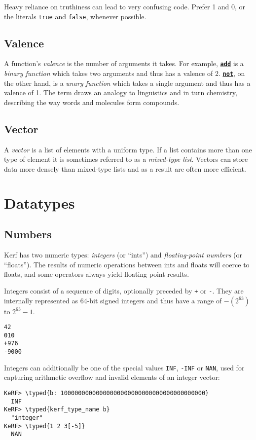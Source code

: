 \documentclass{article}
\newcommand{\typed}[1]{\textcolor{TealBlue}{#1}}
\newcommand{\primu}[2]{\hyperref[prim:#2]{\textbf{\texttt{#1}}}}
\newcommand{\prim}[1]{\primu{#1}{#1}}
\begin{document}
Heavy reliance on truthiness can lead to very confusing code. Prefer 1 and 0, or the literals \texttt{true} and \texttt{false}, whenever possible.

\subsection{Valence}
A function's \emph{valence} is the number of arguments it takes. For example, \prim{add} is a \emph{binary function} which takes two arguments and thus has a valence of 2. \prim{not}, on the other hand, is a \emph{unary function} which takes a single argument and thus has a valence of 1. The term draws an analogy to linguistics and in turn chemistry, describing the way words and molecules form compounds.

\subsection{Vector}
A \emph{vector} is a list of elements with a uniform type. If a list contains more than one type of element it is sometimes referred to as a \emph{mixed-type list}. Vectors can store data more densely than mixed-type lists and as a result are often more efficient.

\pagebreak
\section {Datatypes}

\subsection{Numbers}
Kerf has two numeric types: \emph{integers} (or ``ints'') and \emph{floating-point numbers} (or ``floats''). The results of numeric operations between ints and floats will coerce to floats, and some operators always yield floating-point results.

\vspace{0.5cm}

Integers consist of a sequence of digits, optionally preceded by \texttt{+} or \texttt{-}. They are internally represented as 64-bit signed integers and thus have a range of $-(2^{63})$ to $2^{63}-1$.
\begin{Verbatim}
42
010
+976
-9000
\end{Verbatim}
Integers can additionally be one of the special values \texttt{INF}, \texttt{-INF} or \texttt{NAN}, used for capturing arithmetic overflow and invalid elements of an integer vector:
\begin{Verbatim}
KeRF> \typed{b: 10000000000000000000000000000000000000000}
  INF
KeRF> \typed{kerf_type_name b}
  "integer"
KeRF> \typed{1 2 3[-5]}
  NAN
\end{Verbatim}
\end{document}
